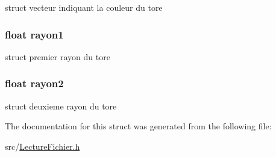 \label{structtorus_a5a4ee24431a1811fa1c8b75844198987}
struct vecteur indiquant la couleur du tore \hypertarget{structtorus_a1b8e70708fd2b25f83f0aacadbe0ddbd}{
\subsubsection[{rayon1}]{\setlength{\rightskip}{0pt plus 5cm}float {\bf rayon1}}}
\label{structtorus_a1b8e70708fd2b25f83f0aacadbe0ddbd}
struct premier rayon du tore \hypertarget{structtorus_a8630bec8bf19ad824e1527744e48178e}{
\subsubsection[{rayon2}]{\setlength{\rightskip}{0pt plus 5cm}float {\bf rayon2}}}
\label{structtorus_a8630bec8bf19ad824e1527744e48178e}
struct deuxieme rayon du tore 

The documentation for this struct was generated from the following file:\begin{DoxyCompactItemize}
\item 
src/\hyperlink{_lecture_fichier_8h}{LectureFichier.h}\end{DoxyCompactItemize}
